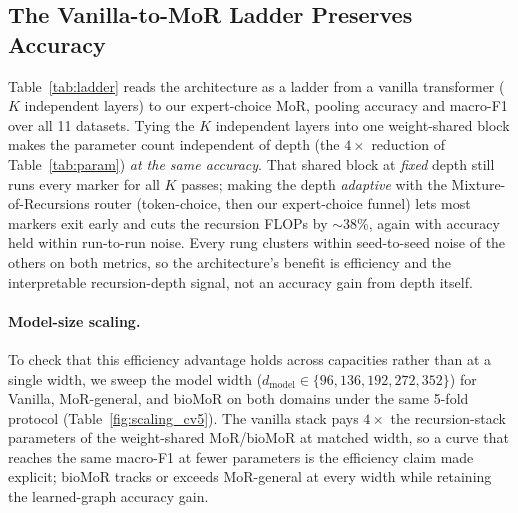 \documentclass[letterpaper]{article}
\begin{document}
\subsection{The Vanilla-to-MoR Ladder Preserves Accuracy}
\label{sec:ladder}
Table~\ref{tab:ladder} reads the architecture as a ladder from a vanilla transformer
($K$ independent layers) to our expert-choice MoR, pooling accuracy and macro-F1 over all
11 datasets. Tying the $K$ independent layers into one weight-shared block makes
the parameter count independent of depth (the $4\times$ reduction of
Table~\ref{tab:param}) \emph{at the same accuracy}. That shared block at \emph{fixed}
depth still runs every marker for all $K$ passes; making the depth \emph{adaptive} with
the Mixture-of-Recursions router (token-choice, then our expert-choice funnel) lets most
markers exit early and cuts the recursion FLOPs by $\sim$38\%, again with
accuracy held within run-to-run noise. Every rung clusters within seed-to-seed noise of
the others on both metrics, so the architecture's benefit is efficiency and the
interpretable recursion-depth signal, not an accuracy gain from depth itself.

\paragraph{Model-size scaling.} To check that this efficiency advantage holds across
capacities rather than at a single width, we sweep the model width
($d_{\mathrm{model}}\in\{96,136,192,272,352\}$) for Vanilla, MoR-general, and bioMoR on both
domains under the same 5-fold protocol (Table~\ref{fig:scaling_cv5}). The vanilla stack pays
$4\times$ the recursion-stack parameters of the weight-shared MoR/bioMoR at matched width, so
a curve that reaches the same macro-F1 at fewer parameters is the efficiency claim made
explicit; bioMoR tracks or exceeds MoR-general at every width while retaining the learned-graph
accuracy gain.
\end{document}

